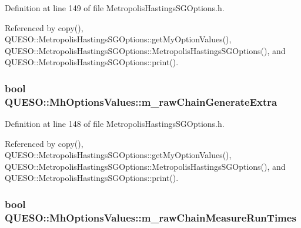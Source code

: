 Definition at line 149 of file Metropolis\-Hastings\-S\-G\-Options.\-h.



Referenced by copy(), Q\-U\-E\-S\-O\-::\-Metropolis\-Hastings\-S\-G\-Options\-::get\-My\-Option\-Values(), Q\-U\-E\-S\-O\-::\-Metropolis\-Hastings\-S\-G\-Options\-::\-Metropolis\-Hastings\-S\-G\-Options(), and Q\-U\-E\-S\-O\-::\-Metropolis\-Hastings\-S\-G\-Options\-::print().

\hypertarget{class_q_u_e_s_o_1_1_mh_options_values_a9d540978290d39df801e32f183450859}{
\subsubsection[{m\-\_\-raw\-Chain\-Generate\-Extra}]{\setlength{\rightskip}{0pt plus 5cm}bool Q\-U\-E\-S\-O\-::\-Mh\-Options\-Values\-::m\-\_\-raw\-Chain\-Generate\-Extra}}\label{class_q_u_e_s_o_1_1_mh_options_values_a9d540978290d39df801e32f183450859}


Definition at line 148 of file Metropolis\-Hastings\-S\-G\-Options.\-h.



Referenced by copy(), Q\-U\-E\-S\-O\-::\-Metropolis\-Hastings\-S\-G\-Options\-::get\-My\-Option\-Values(), Q\-U\-E\-S\-O\-::\-Metropolis\-Hastings\-S\-G\-Options\-::\-Metropolis\-Hastings\-S\-G\-Options(), and Q\-U\-E\-S\-O\-::\-Metropolis\-Hastings\-S\-G\-Options\-::print().

\hypertarget{class_q_u_e_s_o_1_1_mh_options_values_a6fcc2efc9146b68548e62d707aeed883}{
\subsubsection[{m\-\_\-raw\-Chain\-Measure\-Run\-Times}]{\setlength{\rightskip}{0pt plus 5cm}bool Q\-U\-E\-S\-O\-::\-Mh\-Options\-Values\-::m\-\_\-raw\-Chain\-Measure\-Run\-Times}}\label{class_q_u_e_s_o_1_1_mh_options_values_a6fcc2efc9146b68548e62d707aeed883}


